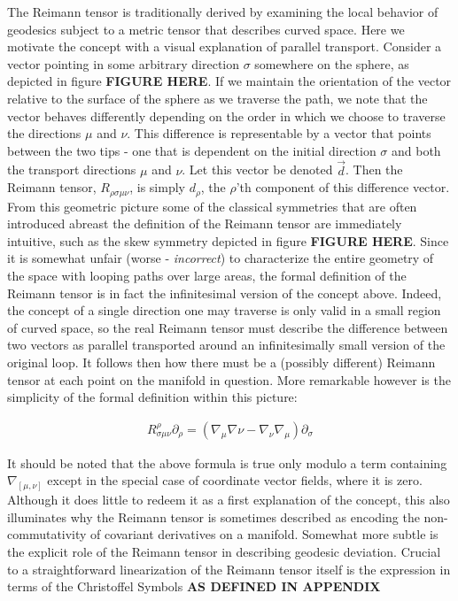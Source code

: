 \documentclass[paper=a4, fontsize=11pt]{scrartcl} %
\numberwithin{equation}{section} %
\numberwithin{figure}{section} %
\numberwithin{table}{section} %
\begin{document}
The Reimann tensor is traditionally derived by examining the local behavior of geodesics subject to a metric tensor that describes curved space. Here we motivate the concept with a visual explanation of parallel transport. Consider a vector pointing in some arbitrary direction $\sigma$ somewhere on the sphere, as depicted in figure \textbf{FIGURE HERE}. If we maintain the orientation of the vector relative to the surface of the sphere as we traverse the path, we note that the vector behaves differently depending on the order in which we choose to traverse the directions $\mu$ and $\nu$. This difference is representable by a vector that points between the two tips - one that is dependent on the initial direction $\sigma$ and both the transport directions $\mu$ and $\nu$. Let this vector be denoted $\vec{d}$. Then the Reimann tensor, $R_{\rho \sigma \mu \nu}$, is simply $d_{\rho}$, the $\rho$'th component of this difference vector. From this geometric picture some of the classical symmetries that are often introduced abreast the definition of the Reimann tensor are immediately intuitive, such as the skew symmetry depicted in figure \textbf{FIGURE HERE}.
Since it is somewhat unfair (worse - \textit{incorrect}) to characterize the entire geometry of the space with looping paths over large areas, the formal definition of the Reimann tensor is in fact the infinitesimal version of the concept above. Indeed, the concept of a single direction one may traverse is only valid in a small region of curved space, so the real Reimann tensor must describe the difference between two vectors as parallel transported around an infinitesimally small version of the original loop. It follows then how there must be a (possibly different) Reimann tensor at each point on the manifold in question. More remarkable however is the simplicity of the formal definition within this picture:

\begin{align}
R^{\rho}_{\sigma \mu \nu}\partial_{\rho} = \left(\nabla_{\mu}\nabla{\nu} - \nabla_{\nu}\nabla_{\mu}\right)\partial_{\sigma}
\end{align} 

It should be noted that the above formula is true only modulo a term containing $\nabla_{[\mu, \nu]}$ except in the special case of coordinate vector fields, where it is zero. Although it does little to redeem it as a first explanation of the concept, this also illuminates why the Reimann tensor is sometimes described as encoding the non-commutativity of covariant derivatives on a manifold. Somewhat more subtle is the explicit role of the Reimann tensor in describing geodesic deviation. Crucial to a straightforward linearization of the Reimann tensor itself is the expression in terms of the Christoffel Symbols \textbf{AS DEFINED IN APPENDIX}
\end{document}
